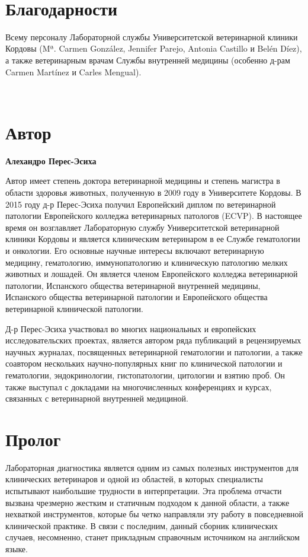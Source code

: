 \documentclass[a4paper,12pt]{book}
\begin{document}
\newpage
~
\newpage

\chapter*{Благодарности}
Всему персоналу Лабораторной службы Университетской ветеринарной клиники Кордовы (Mª. Carmen González, Jennifer Parejo, Antonia Castillo и Belén Díez), а также ветеринарным врачам Службы внутренней медицины (особенно д-рам Carmen Martínez и Carles Mengual).

\newpage
~
\newpage

\chapter*{Автор}
\textbf{Алехандро Перес-Эсиха}

Автор имеет степень доктора ветеринарной медицины и степень магистра в области здоровья животных, полученную в 2009 году в Университете Кордовы. В 2015 году д-р Перес-Эсиха получил Европейский диплом по ветеринарной патологии Европейского колледжа ветеринарных патологов (ECVP). В настоящее время он возглавляет Лабораторную службу Университетской ветеринарной клиники Кордовы и является клиническим ветеринаром в ее Службе гематологии и онкологии. Его основные научные интересы включают ветеринарную медицину, гематологию, иммунопатологию и клиническую патологию мелких животных и лошадей. Он является членом Европейского колледжа ветеринарной патологии, Испанского общества ветеринарной внутренней медицины, Испанского общества ветеринарной патологии и Европейского общества ветеринарной клинической патологии.

Д-р Перес-Эсиха участвовал во многих национальных и европейских исследовательских проектах, является автором ряда публикаций в рецензируемых научных журналах, посвященных ветеринарной гематологии и патологии, а также соавтором нескольких научно-популярных книг по клинической патологии и гематологии, эндокринологии, гистопатологии, цитологии и взятию проб. Он также выступал с докладами на многочисленных конференциях и курсах, связанных с ветеринарной внутренней медициной.

\newpage
%
\chapter*{Пролог}
Лабораторная диагностика является одним из самых полезных инструментов для клинических ветеринаров и одной из областей, в которых специалисты испытывают наибольшие трудности в интерпретации. Эта проблема отчасти вызвана чрезмерно жестким и статичным подходом к данной области, а также нехваткой инструментов, которые бы четко направляли эту работу в повседневной клинической практике. В связи с последним, данный сборник клинических случаев, несомненно, станет прикладным справочным источником на английском языке.
\end{document}
